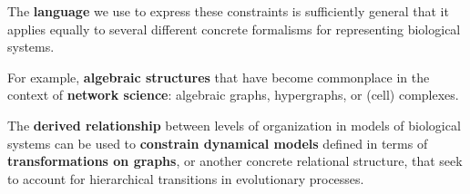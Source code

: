 \begin{frame}
\begin{block}{}
The \textbf{language} we use to express these constraints is sufficiently general that it applies equally to several different concrete formalisms for representing biological systems.
\end{block}
\begin{block}{}
For example, \textbf{algebraic structures} that have become commonplace in the context of \textbf{network science}: algebraic graphs, hypergraphs, or (cell) complexes. 
\end{block}
\begin{block}{}
The \textbf{derived relationship} between levels of organization in models of biological systems can be used to \textbf{constrain dynamical models} defined in terms of \textbf{transformations on graphs}, or another concrete relational structure, that seek to account for hierarchical transitions in evolutionary processes.
\end{block}
\end{frame}
